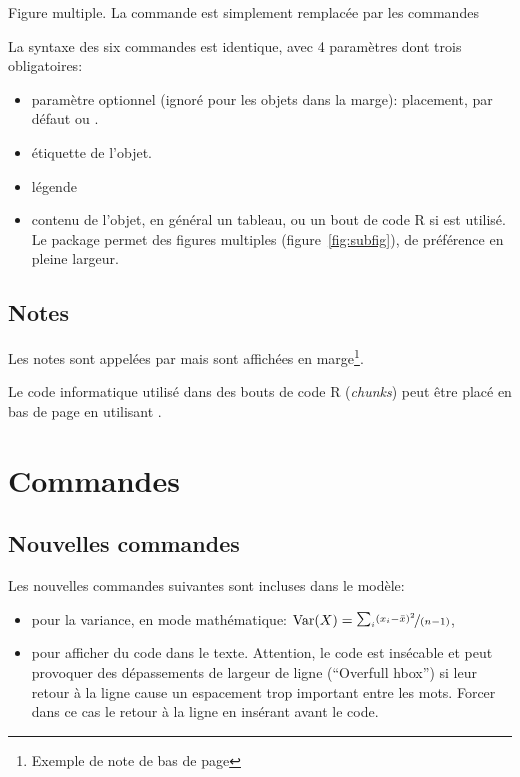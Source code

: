\documentclass[
  a4paper, %
  11pt, extrafontsizes, %
  onecolumn, %
  openright, %
]{memoir}
\begin{document}
{Figure multiple. La commande  est simplement remplacée par les commandes }
{
	\hfill
}

La syntaxe des six commandes est identique, avec 4 paramètres dont trois obligatoires:
\begin{itemize}
  \item paramètre optionnel (ignoré pour les objets dans la marge): placement, par défaut \code{[htbp]} ou \code{[tbp]}.
  \item étiquette de l'objet.
  \item légende
  \item contenu de l'objet, en général un tableau,  ou un bout de code R si  est utilisé. Le package  permet des figures multiples (figure~\ref{fig:subfig}), de préférence en pleine largeur.
\end{itemize}


\subsection{Notes}

Les notes sont appelées par  mais sont affichées en marge\footnote{Exemple de note de \og bas de page\fg{}}.

Le code informatique utilisé dans des bouts de code R (\foreignlanguage{english}{\emph{chunks}}) peut être placé en bas de page en utilisant  
.


\section{Commandes}

\subsection{Nouvelles commandes}

Les nouvelles commandes suivantes sont incluses dans le modèle:
\begin{itemize}
  \item {} pour la variance, en mode mathématique: $\mathop{\mathrm{Var}}(X)=\nicefrac{\sum_i(x_i-\bar{x})^2}{(n-1)}$,
  \item {} pour afficher du code dans le texte. Attention, le code est insécable et peut provoquer des dépassements de largeur de ligne (\foreignlanguage{english}{``Overfull hbox''}) si leur retour à la ligne cause un espacement trop important entre les mots. Forcer dans ce cas le retour à la ligne en insérant  avant le code.
\end{itemize}
\end{document}
